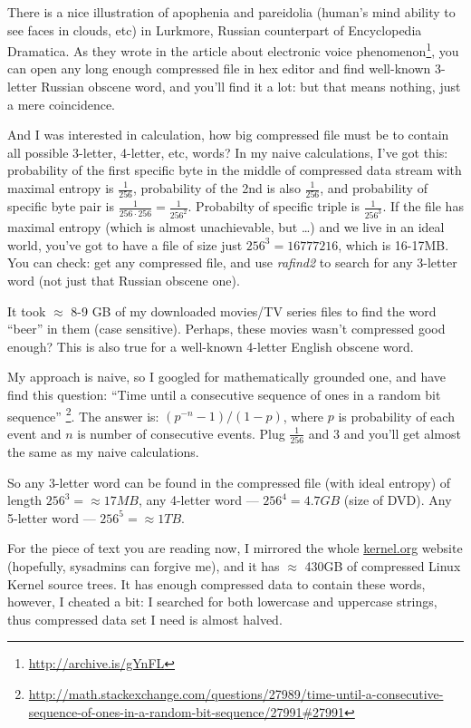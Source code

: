 There is a nice illustration of apophenia and pareidolia
(human's mind ability to see faces in clouds, etc) in Lurkmore, Russian counterpart of Encyclopedia Dramatica.
As they wrote in the article about electronic voice phenomenon\footnote{\url{http://archive.is/gYnFL}},
you can open any long enough compressed file in hex editor and find well-known 3-letter Russian obscene word, and you'll find it a lot: but that means nothing, just a mere coincidence.

And I was interested in calculation, how big compressed file must be to contain all possible 3-letter, 4-letter, etc, words?
In my naive calculations, I've got this: probability of the first specific byte in the middle of compressed data stream with maximal entropy is $\frac{1}{256}$, probability of the 2nd is also $\frac{1}{256}$,
and probability of specific byte pair is $\frac{1}{256 \cdot 256} = \frac{1}{256^2}$.
Probabilty of specific triple is $\frac{1}{256^3}$.
If the file has maximal entropy (which is almost unachievable, but \dots) and we live in an ideal world, you've got to have a file of size just $256^3=16777216$, which is 16-17MB.
You can check: get any compressed file, and use \textit{rafind2} to search for any 3-letter word (not just that Russian obscene one).

It took $\approx$ 8-9 GB of my downloaded movies/TV series files to find the word ``beer'' in them (case sensitive).
Perhaps, these movies wasn't compressed good enough?
This is also true for a well-known 4-letter English obscene word.

My approach is naive, so I googled for mathematically grounded one, and have find this question:
``Time until a consecutive sequence of ones in a random bit sequence''
\footnote{\url{http://math.stackexchange.com/questions/27989/time-until-a-consecutive-sequence-of-ones-in-a-random-bit-sequence/27991\#27991}}.
The answer is: $(p^{−n}−1)/(1−p)$, where $p$ is probability of each event and $n$ is number of consecutive events.
Plug $\frac{1}{256}$ and $3$ and you'll get almost the same as my naive calculations.

So any 3-letter word can be found in the compressed file (with ideal entropy) of length $256^3 = \approx 17MB$, any 4-letter word --- $256^4 = 4.7GB$ (size of DVD).
Any 5-letter word --- $256^5 = \approx 1TB$.

For the piece of text you are reading now, I mirrored the whole \href{https://www.kernel.org/}{kernel.org} website (hopefully, sysadmins can forgive me),
and it has $\approx$ 430GB of compressed Linux Kernel source trees.
It has enough compressed data to contain these words, however, I cheated a bit: I searched for both lowercase and uppercase strings, thus compressed data set I need is almost halved.

